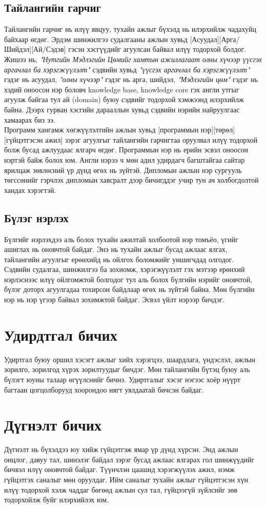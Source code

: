 \subsection{Тайлангийн гарчиг}
Тайлангийн гарчиг нь илүү явцуу, тухайн ажлыг бүхэлд нь илэрхийлж чадахуйц байхаар өгдөг. Эрдэм шинжилгээ судалгааны ажлын хувьд [Асуудал][Арга/Шийдэл][Ай/Сэдэв] гэсэн хэсгүүдийг агуулсан байвал илүү тодорхой болдог. Жишээ нь, \textit{"Нутгийн Мэдлэгийн Цөмийг хамтын ажиллагаат олны хүчээр үүсгэх аргачлал ба хэрэгжүүлэлт"} сэдвийн хувьд \textit{"үүсгэх аргачлал ба хэрэгжүүлэлт"} гэдэг нь асуудал, \textit{"олны хүчээр"} гэдэг нь арга, шийдэл, \textit{"Мэдлэгийн цөм"} гэдэг нь хэдий оноосон нэр боловч knowledge base, knowledge core гэх англи утгыг агуулж байгаа тул ай (domain) буюу сэдвийг тодорхой хэмжээнд илэрхийлж байна. Дээрх гурван хэсгийн дарааллын хувьд сэдвийн нэрийн найруулгаас хамаарах биз ээ.
\\Программ хангамж хөгжүүлэлтийн ажлын хувьд [программын нэр][төрөл][гүйцэтгэсэн ажил] зэрэг агуулгыг тайлангийн гарчигтаа оруулвал илүү тодорхой болж бусад ажлуудаас ялгарч өгдөг. Программын нэр нь ерийн эсвэл оноосон нэртэй байж болох юм. 
Англи нэрээ ч мөн адил удирдагч багштайгаа сайтар ярилцаж зөвлөсний үр дүнд өгөх нь зүйтэй. Дипломын ажлын нэр сургууль төгссөнийг гэрчлэх дипломын хавсралт дээр бичигддэг учир тун ач холбогдолтой хандах хэрэгтэй.

\subsection{Бүлэг нэрлэх}
Бүлгийг нэрлэхдээ аль болох тухайн ажилтай холбоотой нэр томъёо, үгийг ашиглах нь оновчтой байдаг. Энэ нь тухайн ажлыг бусад ажлаас ялгах, тайлангийн агуулгыг ерөнхийд нь ойлгох боломжийг уншигчдад олгодог. Сэдвийн судалгаа, шинжилгээ ба зохиомж, хэрэгжүүлэлт гэх мэтээр ерөнхий нэрлэснээс илүү ойлгомжтой болгодог тул аль болох бүлгийн нэрийг оновчтой, бүлэг доторх агуулгадаа тохирсон байдлаар өгөх нь зүйтэй байна. Мөн бүлгийн нэр нь нэр үгээр байвал зохимжтой байдаг. Эсвэл үйлт нэрээр бичдэг.

\section{Удирдтгал бичих}
Удиртгал буюу оршил хэсэгт ажлыг хийх хэрэгцээ, шаардлага, үндэслэл, ажлын зорилго, зорилгод хүрэх зорилтуудыг бичдэг. Мөн тайлангийн бүтэц буюу аль бүлэгт юуны талаар өгүүлснийг бичнэ. Удиртгалыг хэсэг нэгээс хоёр нүүрт багтаан цогцолборууд хоорондоо нягт уялдаатай бичсэн байдаг.

\section{Дүгнэлт бичих}
Дүгнэлт нь бүхэлдээ юу хийж гүйцэтгэж ямар үр дүнд хүрсэн. Энд ажлын онцлог, давуу тал, шинэлэг байдал зэрэг бусад ажлаас ялгарах гол шинжүүдийг бичвэл илүү оновчтой байдаг. Түүнчлэн цаашид хэрэгжүүлэх ажил, нэмж гүйцэтгэх саналыг мөн оруулдаг. Ийм саналыг тухайн ажлыг гүйцэтгэсэн хүн илүү тодорхой хэлж чаддаг бөгөөд ажлын сул тал, гүйцээгүй зүйлсийг зөв тодорхойлж буйг илэрхийлэх юм.